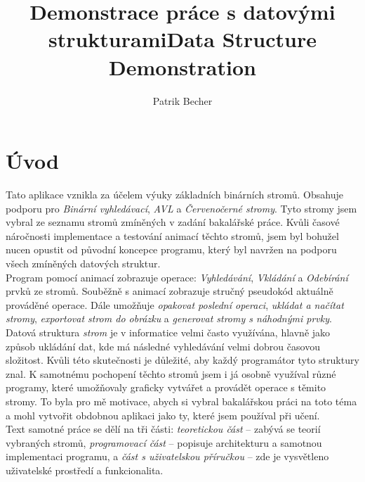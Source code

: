 \documentclass[
  biblatex=false,
  font=serif,
  glossaries=false,
  tables=false,
  theorems=false,
  index
]{kidiplom}
\title{Demonstrace práce s datovými strukturami}
\title[english]{Data Structure Demonstration}
\author{Patrik Becher}
\begin{document}


\maketitle



\section{Úvod}
\indent\indent Tato aplikace vznikla za účelem výuky základních binárních stromů. Obsahuje podporu pro \textit{Binární vyhledávací}, \textit{AVL} a \textit{Červenočerné stromy}. Tyto stromy jsem vybral ze seznamu stromů zmíněných v zadání bakalářské práce. Kvůli časové náročnosti implementace a testování animací těchto stromů, jsem byl bohužel nucen opustit od původní koncepce programu, který byl navržen na podporu všech zmíněných datových struktur.\\
\indent Program pomocí animací zobrazuje operace: \textit{Vyhledávání}, \textit{Vkládání} a \textit{Odebírání} prvků ze stromů. Souběžně s animací zobrazuje stručný pseudokód aktuálně prováděné operace. Dále umožňuje \textit{opakovat poslední operaci}, \textit{ukládat a načítat stromy}, \textit{exportovat strom do obrázku} a \textit{generovat stromy s náhodnými prvky}.\\
\indent Datová struktura \textit{strom} je v informatice velmi často využívána, hlavně jako způsob ukládání dat, kde má následné vyhledávání velmi dobrou časovou složitost. Kvůli této skutečnosti je důležité, aby každý programátor tyto struktury znal. K samotnému pochopení těchto stromů jsem i já osobně využíval různé programy, které umožňovaly graficky vytvářet a provádět operace s těmito stromy. To byla pro mě motivace, abych si vybral bakalářskou práci na toto téma a mohl vytvořit obdobnou aplikaci jako ty, které jsem používal při učení. \\
\indent Text samotné práce se dělí na tři části: \textit{teoretickou část} -- zabývá se teorií vybraných stromů, \textit{programovací část} -- popisuje architekturu a samotnou implementaci programu, a \textit{část s uživatelskou příručkou} --  zde je vysvětleno uživatelské prostředí a funkcionalita.\\
\newpage
\end{document}
